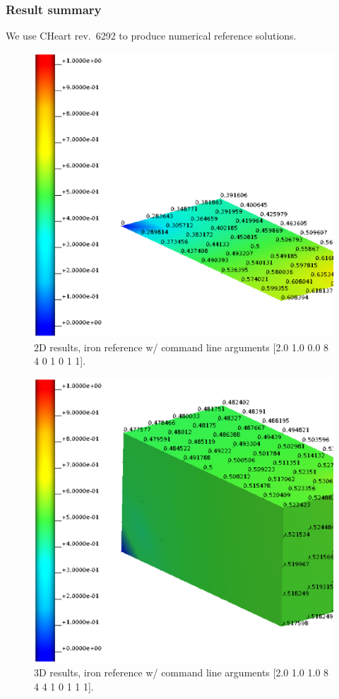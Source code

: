 \subsubsection{Result summary}
%
We use CHeart rev.\ 6292 to produce numerical reference solutions.
%


%
\begin{figure}[h!]
    \centering 
    \includegraphics[width=0.9\columnwidth]{examples/example-0011/doc/figures/iron_reference_2D.eps} 
    \caption{2D results, iron reference w/ command line arguments [2.0 1.0 0.0 8 4 0 1 0 1 1].}
    \label{example-0011-iron-2D-reference-fig}
\end{figure}
%
\begin{figure}[h!]
    \centering 
    \includegraphics[width=0.9\columnwidth]{examples/example-0011/doc/figures/iron_reference_3D.eps} 
    \caption{3D results, iron reference w/ command line arguments [2.0 1.0 1.0 8 4 4 1 0 1 1 1].}
    \label{example-0011-iron-3D-reference-fig}
\end{figure}
%
